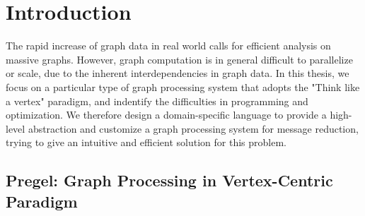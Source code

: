 \documentclass{sokendai_thesis} %
\begin{document}
\tableofcontents


\mainmatter

\chapter{Introduction}

The rapid increase of graph data in real world calls for efficient analysis on massive graphs.
However, graph computation is in general difficult to parallelize or scale, due to the inherent interdependencies in graph data.
In this thesis, we focus on a particular type of graph processing system that adopts the "Think like a vertex" paradigm, and indentify the difficulties in programming and optimization.
We therefore design a domain-specific language to provide a high-level abstraction and customize a graph processing system for message reduction, trying to give an intuitive and efficient solution for this problem.

\section{Pregel: Graph Processing in Vertex-Centric Paradigm}
\end{document}
